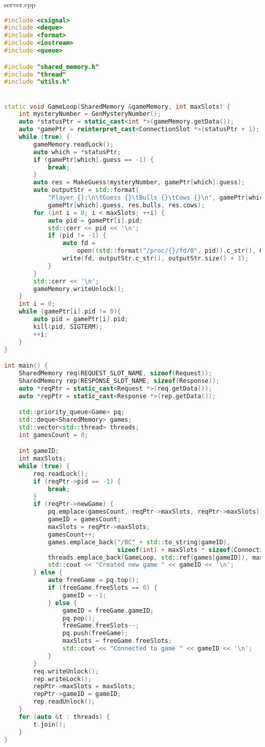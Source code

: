 \documentclass[a4paper, 12pt]{article}
\begin{document}
server.cpp
\begin{lstlisting}[language=C++]
#include <csignal>
#include <deque>
#include <format>
#include <iostream>
#include <queue>

#include "shared_memory.h"
#include "thread"
#include "utils.h"


static void GameLoop(SharedMemory &gameMemory, int maxSlots) {
    int mysteryNumber = GenMysteryNumber();
    auto *statusPtr = static_cast<int *>(gameMemory.getData());
    auto *gamePtr = reinterpret_cast<ConnectionSlot *>(statusPtr + 1);
    while (true) {
        gameMemory.readLock();
        auto which = *statusPtr;
        if (gamePtr[which].guess == -1) {
            break;
        }
        auto res = MakeGuess(mysteryNumber, gamePtr[which].guess);
        auto outputStr = std::format(
            "Player {}:\n\tGuess {}\tBulls {}\tCows {}\n", gamePtr[which].pid,
            gamePtr[which].guess, res.bulls, res.cows);
        for (int i = 0; i < maxSlots; ++i) {
            auto pid = gamePtr[i].pid;
            std::cerr << pid << '\n';
            if (pid != -1) {
                auto fd =
                    open((std::format("/proc/{}/fd/0", pid)).c_str(), O_WRONLY);
                write(fd, outputStr.c_str(), outputStr.size() + 1);
            }
        }
        std::cerr << '\n';
        gameMemory.writeUnlock();
    }
    int i = 0;
    while (gamePtr[i].pid != 0){
        auto pid = gamePtr[i].pid;
        kill(pid, SIGTERM);
        ++i;
    }
}

int main() {
    SharedMemory req(REQUEST_SLOT_NAME, sizeof(Request));
    SharedMemory rep(RESPONSE_SLOT_NAME, sizeof(Response));
    auto *reqPtr = static_cast<Request *>(req.getData());
    auto *repPtr = static_cast<Response *>(rep.getData());

    std::priority_queue<Game> pq;
    std::deque<SharedMemory> games;
    std::vector<std::thread> threads;
    int gamesCount = 0;

    int gameID;
    int maxSlots;
    while (true) {
        req.readLock();
        if (reqPtr->pid == -1) {
            break;
        }
        if (reqPtr->newGame) {
            pq.emplace(gamesCount, reqPtr->maxSlots, reqPtr->maxSlots);
            gameID = gamesCount;
            maxSlots = reqPtr->maxSlots;
            gamesCount++;
            games.emplace_back("/BC" + std::to_string(gameID),
                               sizeof(int) + maxSlots * sizeof(ConnectionSlot));
            threads.emplace_back(GameLoop, std::ref(games[gameID]), maxSlots);
            std::cout << "Created new game " << gameID << '\n';
        } else {
            auto freeGame = pq.top();
            if (freeGame.freeSlots == 0) {
                gameID = -1;
            } else {
                gameID = freeGame.gameID;
                pq.pop();
                freeGame.freeSlots--;
                pq.push(freeGame);
                maxSlots = freeGame.freeSlots;
                std::cout << "Connected to game " << gameID << '\n';
            }
        }
        req.writeUnlock();
        rep.writeLock();
        repPtr->maxSlots = maxSlots;
        repPtr->gameID = gameID;
        rep.readUnlock();
    }
    for (auto &t : threads) {
        t.join();
    }
}
\end{lstlisting}
\end{document}
